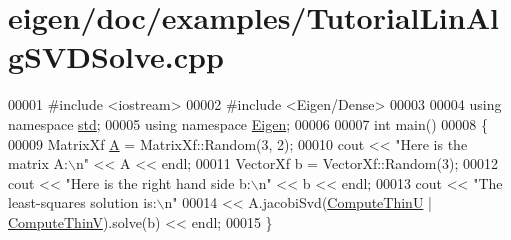 \hypertarget{eigen_2doc_2examples_2_tutorial_lin_alg_s_v_d_solve_8cpp_source}{}\section{eigen/doc/examples/\+Tutorial\+Lin\+Alg\+S\+V\+D\+Solve.cpp}
\label{eigen_2doc_2examples_2_tutorial_lin_alg_s_v_d_solve_8cpp_source}

\begin{DoxyCode}
00001 \textcolor{preprocessor}{#include <iostream>}
00002 \textcolor{preprocessor}{#include <Eigen/Dense>}
00003 
00004 \textcolor{keyword}{using namespace }\hyperlink{namespacestd}{std};
00005 \textcolor{keyword}{using namespace }\hyperlink{namespace_eigen}{Eigen};
00006 
00007 \textcolor{keywordtype}{int} main()
00008 \{
00009    MatrixXf \hyperlink{group___core___module_class_eigen_1_1_matrix}{A} = MatrixXf::Random(3, 2);
00010    cout << \textcolor{stringliteral}{"Here is the matrix A:\(\backslash\)n"} << A << endl;
00011    VectorXf b = VectorXf::Random(3);
00012    cout << \textcolor{stringliteral}{"Here is the right hand side b:\(\backslash\)n"} << b << endl;
00013    cout << \textcolor{stringliteral}{"The least-squares solution is:\(\backslash\)n"}
00014         << A.jacobiSvd(\hyperlink{group__enums_ggae3e239fb70022eb8747994cf5d68b4a9af8c742a1aa87773e165eae406c9ccaf8}{ComputeThinU} | \hyperlink{group__enums_ggae3e239fb70022eb8747994cf5d68b4a9a1055e53fa95c8ae04a07ebb72cfafd95}{ComputeThinV}).solve(b) << endl;
00015 \}
\end{DoxyCode}
